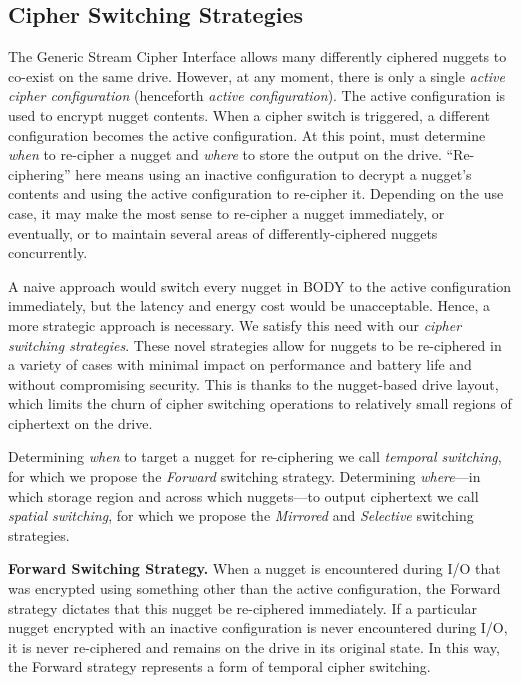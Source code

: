 \subsection{Cipher Switching Strategies} \label{subsec:strategies}

The Generic Stream Cipher Interface allows many differently ciphered nuggets to
co-exist on the same drive. However, at any moment, there is only a single
\emph{active cipher configuration} (henceforth \emph{active configuration}). The
active configuration is used to encrypt nugget contents. When a cipher switch is
triggered, a different configuration becomes the active configuration. At this
point, \sys must determine \emph{when} to re-cipher a nugget and
\emph{where} to store the output on the drive. ``Re-ciphering'' here means using
an inactive configuration to decrypt a nugget's contents and using the active
configuration to re-cipher it. Depending on the use case, it may make the most
sense to re-cipher a nugget immediately, or eventually, or to maintain several
areas of differently-ciphered nuggets concurrently.

A naive approach would switch every nugget in BODY to the active configuration
immediately, but the latency and energy cost would be unacceptable. Hence, a
more strategic approach is necessary. We satisfy this need with our \emph{cipher
switching strategies}. These novel strategies allow for nuggets to be
re-ciphered in a variety of cases with minimal impact on performance and battery
life and without compromising security. This is thanks to the nugget-based drive
layout, which limits the churn of cipher switching operations to relatively
small regions of ciphertext on the drive.

Determining \emph{when} to target a nugget for re-ciphering we call
\emph{temporal switching}, for which we propose the \emph{Forward} switching
strategy. Determining \emph{where}---in which storage region and across which
nuggets---to output ciphertext we call \emph{spatial switching}, for which we
propose the \emph{Mirrored} and \emph{Selective} switching strategies.

\textbf{Forward Switching Strategy.} When a nugget is encountered during I/O
that was encrypted using something other than the active configuration, the
Forward strategy dictates that this nugget be re-ciphered immediately. If a
particular nugget encrypted with an inactive configuration is never encountered
during I/O, it is never re-ciphered and remains on the drive in its original
state. In this way, the Forward strategy represents a form of temporal cipher
switching.

